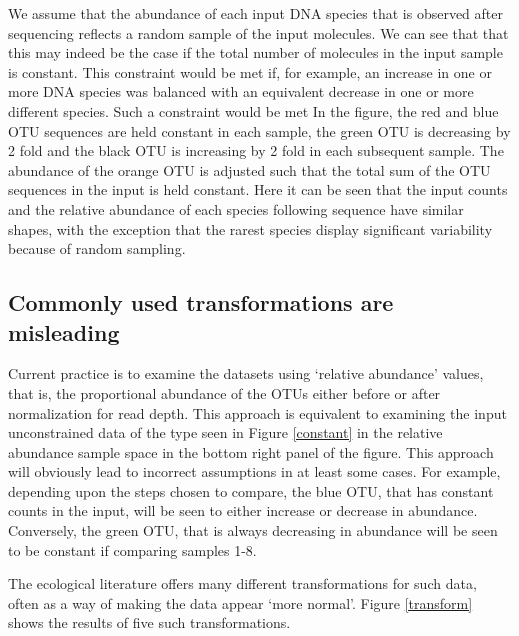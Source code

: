 \documentclass[twocolumn]{article}
\begin{document}
We assume that the abundance of each input DNA species that is observed
after sequencing reflects a random sample of the input molecules. We can
see that that this may indeed be the case if the total number of
molecules in the input sample is constant. This constraint would be met
if, for example, an increase in one or more DNA species was balanced
with an equivalent decrease in one or more different species. Such a
constraint would be met In the figure, the red and blue OTU sequences
are held constant in each sample, the green OTU is decreasing by 2 fold
and the black OTU is increasing by 2 fold in each subsequent sample. The
abundance of the orange OTU is adjusted such that the total sum of the
OTU sequences in the input is held constant. Here it can be seen that
the input counts and the relative abundance of each species following
sequence have similar shapes, with the exception that the rarest species
display significant variability because of random sampling.

\subsection{Commonly used transformations are
misleading}\label{commonly-used-transformations-are-misleading}

Current practice is to examine the datasets using `relative abundance'
values, that is, the proportional abundance of the OTUs either before or
after normalization for read depth. This approach is equivalent to
examining the input unconstrained data of the type seen in Figure
\ref{constant} in the relative abundance sample space in the bottom
right panel of the figure. This approach will obviously lead to
incorrect assumptions in at least some cases. For example, depending
upon the steps chosen to compare, the blue OTU, that has constant counts
in the input, will be seen to either increase or decrease in abundance.
Conversely, the green OTU, that is always decreasing in abundance will
be seen to be constant if comparing samples 1-8.

The ecological literature offers many different transformations for such
data, often as a way of making the data appear `more normal'. Figure
\ref{transform} shows the results of five such transformations.
\end{document}
